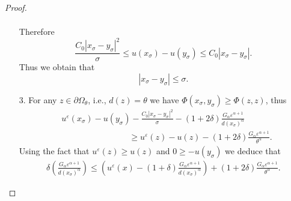 \documentclass[11pt,reqno]{amsart}
\numberwithin{figure}{section}
\theoremstyle{plain}
\theoremstyle{remark}
\numberwithin{equation}{section}
\begin{document}
\begin{proof}
\begin{enumerate}
\begin{align*}
    \end{align*}
    Therefore
    \begin{equation*}
        \frac{C_0|x_\sigma - y_\sigma|^2}{\sigma} \leq u(x_\sigma) - u(y_\sigma) \leq C_0|x_\sigma - y_\sigma|.
    \end{equation*}
    Thus we obtain that
    \begin{equation*}
        |x_\sigma - y_\sigma|\leq \sigma.
    \end{equation*}
    \item[3.] For any $z\in \partial\Omega_\theta$, i.e., $d(z) = \theta$ we have $\Phi(x_\sigma,y_\sigma)\geq \Phi(z,z)$, thus
    \begin{align*}
          & u^\varepsilon(x_\sigma) - u(y_\sigma) - \frac{C_0|x_\sigma-y_\sigma |^2}{\sigma}- \left(1+2\delta\right)\frac{G_\alpha\varepsilon^{\alpha+1}}{d(x_\sigma)^{\alpha}} \\
        & \qquad\qquad\qquad\qquad \geq u^\varepsilon(z) - u(z) - \left(1+2\delta\right)\frac{G_\alpha\varepsilon^{\alpha+1}}{\theta^{\alpha}}.
    \end{align*}
    Using the fact that $u^\varepsilon(z) \geq u(z)$ and $0\geq -u(y_\sigma)$ we deduce that
    \begin{align*}
        \delta\left(\frac{G_\alpha\varepsilon^{\alpha+1}}{d(x_\sigma)^{\alpha}}\right) \leq \left(u^\varepsilon(x) - \left(1+\delta\right)\frac{G_\alpha\varepsilon^{\alpha+1}}{d(x_\sigma)^{\alpha}}\right) + \left(1+2\delta\right)\frac{G_\alpha\varepsilon^{\alpha+1}}{\theta^{\alpha}}.
    \end{align*}
\end{enumerate}
\end{proof}
\end{document}
